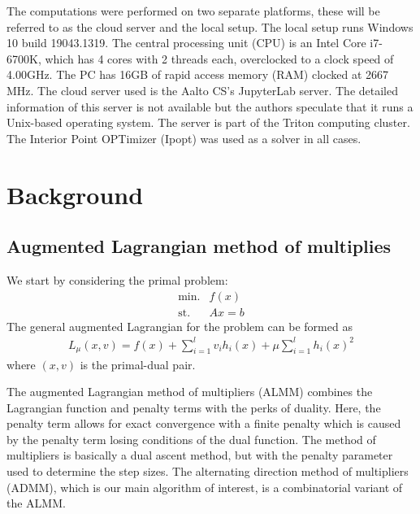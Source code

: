\documentclass[a4paper]{artikel3}
\begin{document}
The computations were performed on two separate platforms, these will be referred to as the cloud server and the local setup. The local setup runs Windows 10 build 19043.1319. The central processing unit (CPU) is an Intel Core i7-6700K, which has 4 cores with 2 threads each, overclocked to a clock speed of 4.00GHz. The PC has 16GB of rapid access memory (RAM) clocked at 2667 MHz. The cloud server used is the Aalto CS's JupyterLab server. The detailed information of this server is not available but the authors speculate that it runs a Unix-based operating system. The server is part of the Triton computing cluster. The Interior Point OPTimizer (Ipopt) was used as a solver in all cases.

\section{Background} \label{sec:background}


\subsection{Augmented Lagrangian method of multiplies}
We start by considering the primal problem:
\begin{align}
    \text{min.} &f(x) \\
    \text{st.} &Ax = b
\end{align}
The general augmented Lagrangian for the problem can be formed as
\begin{align}
    L_{\mu} (x,v) = f(x) +\sum_{i=1}^l v_i h_i(x) + \mu \sum_{i=1}^l h_i(x)^2
    \label{fnc:ADMM}
\end{align}
where $(x,v)$ is the primal-dual pair.


The augmented Lagrangian method of multipliers (ALMM) combines the Lagrangian function and penalty terms with the perks of duality. Here, the penalty term allows for exact convergence with a finite penalty which is caused by the penalty term losing conditions of the dual function. The method of multipliers is basically a dual ascent method, but with the penalty parameter used to determine the step sizes. The alternating direction method of multipliers (ADMM), which is our main algorithm of interest, is a combinatorial variant of the ALMM.
\end{document}
